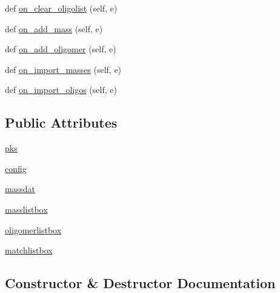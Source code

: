 \begin{DoxyCompactItemize}
\item 
def \hyperlink{class_uni_dec_1_1unidec__modules_1_1masstools_1_1_mass_selection_a53f874687420863a3e6de6b6320d32fa}{on\+\_\+clear\+\_\+oligolist} (self, e)
\item 
def \hyperlink{class_uni_dec_1_1unidec__modules_1_1masstools_1_1_mass_selection_aa2b3313ad7cbc3ab15bc9dc834961640}{on\+\_\+add\+\_\+mass} (self, e)
\item 
def \hyperlink{class_uni_dec_1_1unidec__modules_1_1masstools_1_1_mass_selection_a792fcc9ed77182a97002708d81f10135}{on\+\_\+add\+\_\+oligomer} (self, e)
\item 
def \hyperlink{class_uni_dec_1_1unidec__modules_1_1masstools_1_1_mass_selection_ae4ff6fbeea385a958a8f8cead3118598}{on\+\_\+import\+\_\+masses} (self, e)
\item 
def \hyperlink{class_uni_dec_1_1unidec__modules_1_1masstools_1_1_mass_selection_a1f27db354439e570fe2e14c7ebd0b458}{on\+\_\+import\+\_\+oligos} (self, e)
\end{DoxyCompactItemize}
\subsection*{Public Attributes}
\begin{DoxyCompactItemize}
\item 
\hyperlink{class_uni_dec_1_1unidec__modules_1_1masstools_1_1_mass_selection_aac720d56928d377d220e42d8cd2e40e1}{pks}
\item 
\hyperlink{class_uni_dec_1_1unidec__modules_1_1masstools_1_1_mass_selection_a206b9fe861f8deecb3724807fef50829}{config}
\item 
\hyperlink{class_uni_dec_1_1unidec__modules_1_1masstools_1_1_mass_selection_a0933a1c1a1a29ed108915fe3c74d67dc}{massdat}
\item 
\hyperlink{class_uni_dec_1_1unidec__modules_1_1masstools_1_1_mass_selection_a3d7c44cc908ab7b7b5451c7a4c7badd4}{masslistbox}
\item 
\hyperlink{class_uni_dec_1_1unidec__modules_1_1masstools_1_1_mass_selection_a44857716384d9caae36ada62e6980e53}{oligomerlistbox}
\item 
\hyperlink{class_uni_dec_1_1unidec__modules_1_1masstools_1_1_mass_selection_a38000d3e6e5bba5abfe9b5f0fa8b7c23}{matchlistbox}
\end{DoxyCompactItemize}


\subsection{Constructor \& Destructor Documentation}
\hypertarget{class_uni_dec_1_1unidec__modules_1_1masstools_1_1_mass_selection_a3fbe49a10061b8e2ae68b1a4ccf2264b}{}
